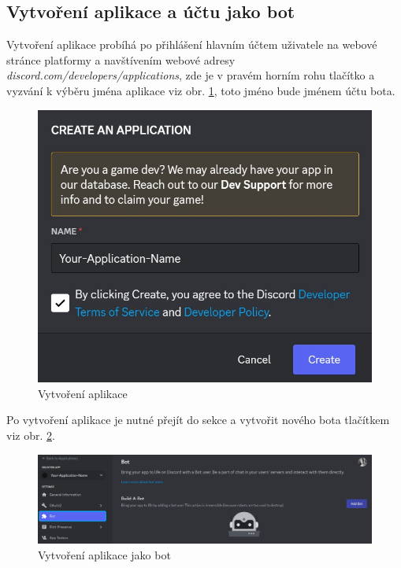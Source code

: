 \documentclass[
  program=inf,
biblatex=false,
sourcecodes=true,
joinlists=true,
  figures=true,
  tables=true,
  glossaries=true,
  index=false
]{kidiplom}
\begin{document}
\subsection{Vytvoření aplikace a účtu jako bot}
Vytvoření aplikace probíhá po přihlášení hlavním účtem uživatele na webové stránce platformy a navštívením webové adresy {\it discord.com/developers/applications}, 
zde je v pravém horním rohu tlačítko  a vyzvání k výběru jména aplikace viz obr. \ref{create}, toto jméno bude jménem účtu bota.

\begin{figure}[h]
  \centering \includegraphics[scale=1]{create}
  \caption{\label{create}Vytvoření aplikace}
\end{figure}

Po vytvoření aplikace je nutné přejít do sekce  a vytvořit nového bota tlačítkem  
viz obr. \ref{bot}.

\begin{figure}[h]
  \centering \includegraphics[scale=0.32]{bot}
  \caption{\label{bot}Vytvoření aplikace jako bot}
\end{figure}
\end{document}
